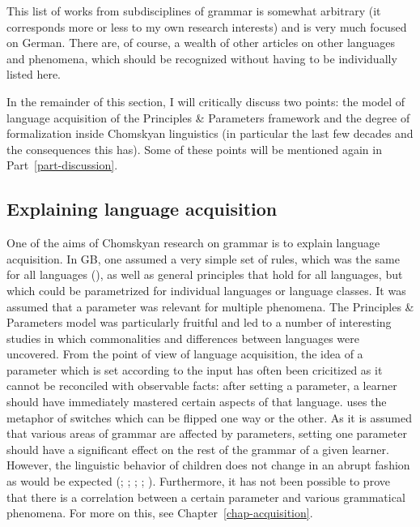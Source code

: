 This list of works from subdisciplines of grammar is somewhat arbitrary (it corresponds more or less to my own
research interests) and is very much focused on German. There are, of course, a wealth of other articles on other
languages and phenomena, which should be recognized without having to be individually listed here.

In the remainder of this section, I will critically discuss two points: the model of language acquisition of the Principles
\& Parameters framework and the degree of formalization inside Chomskyan linguistics (in particular the last few decades
and the consequences this has). Some of these points will be mentioned again in Part~\ref{part-discussion}. 

\subsection{Explaining language acquisition}
\label{sec-acquisition-gb}

One of the aims of Chomskyan research on grammar is to explain language acquisition. In GB, one
assumed a very simple set of rules, which was the same for all languages (\xbart), as well as
general principles that hold for all languages, but which could be parametrized for individual
languages or language classes. It was assumed that a parameter was relevant for multiple phenomena.
The Principles \& Parameters model was particularly fruitful and led to a number of interesting
studies in which commonalities and differences between languages were uncovered. From the point of
view of language acquisition, the idea of a parameter which is set according to the input has often
been cricitized as it cannot be reconciled with observable facts: after setting a parameter, a
learner should have immediately mastered certain aspects of that language. \citet[]{Chomsky86} uses the metaphor of switches which can be flipped one way or the other. As it is
assumed that various areas of grammar are affected by parameters, setting one parameter should have
a significant effect on the rest of the grammar of a given learner.  However, the linguistic
behavior of children does not change in an abrupt fashion as would be expected (\citealp[]{Bloom93a}; \citealp[]{Haider93a}; \citealp[]{Abney96a};
\citealp[Section~9.1]{AW98a}; \citealp{Tomasello2000a,Tomasello2003a}).
Furthermore, it has not been possible to prove that there is
a correlation between a certain parameter and various grammatical phenomena. For more on this, see
Chapter~\ref{chap-acquisition}.


